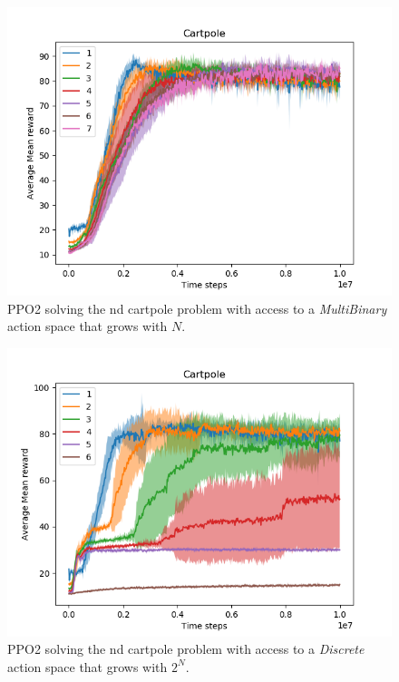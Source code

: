 \begin{figure}
  \centering
  \includegraphics[width=1\textwidth,height=0.5\textheight]{../../pictures/figures/multibinary-nd-cart.png}
  \caption{PPO2 solving the nd cartpole problem with access to a \textit{MultiBinary} action space that grows with $N$.}
\end{figure}

\begin{figure}
\centering
\includegraphics[width=1\textwidth,height=0.5\textheight]{../../pictures/figures/discrete-nd-cart.png}
\caption{PPO2 solving the nd cartpole problem with access to a \textit{Discrete} action space that grows with $2^N$.}
\end{figure}


